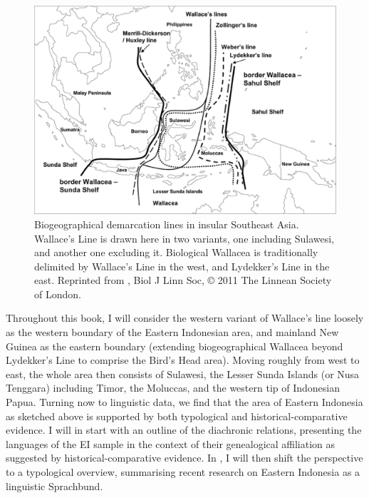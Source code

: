 \begin{figure}

\includegraphics[width=1.0\textwidth]{figures/Wallacea2.eps}
\caption[Biogeographical demarcation lines in insular Southeast Asia]{Biogeographical demarcation lines in insular Southeast Asia. Wallace's Line is drawn here in two variants, one including Sulawesi, and another one excluding it. Biological Wallacea is traditionally delimited by Wallace's Line in the west, and Lydekker's Line in the east. Reprinted from \citealt{Welzen2011}, Biol J Linn Soc, © 2011 The Linnean Society of London.}\label{map:wallacea}

\end{figure}

Throughout this book, I will consider the western variant of Wallace's line loosely as the western boundary of the Eastern Indonesian area, and mainland New Guinea as the eastern boundary (extending biogeographical Wallacea beyond Lydekker's Line to comprise the Bird's Head area). Moving roughly from west to east, the whole area then consists of Sulawesi, the Lesser Sunda Islands (or Nusa Tenggara) including Timor, the Moluccas, and the western tip of Indonesian Papua. Turning now to linguistic data, we find that the area of Eastern Indonesia as sketched above is supported by both typological and historical-comparative evidence. I will in  start with an outline of the diachronic relations, presenting the languages of the EI sample in the context of their genealogical affiliation as suggested by historical-comparative evidence. In , I will then shift the perspective to a typological overview, summarising recent research on Eastern Indonesia as a linguistic Sprachbund. 

